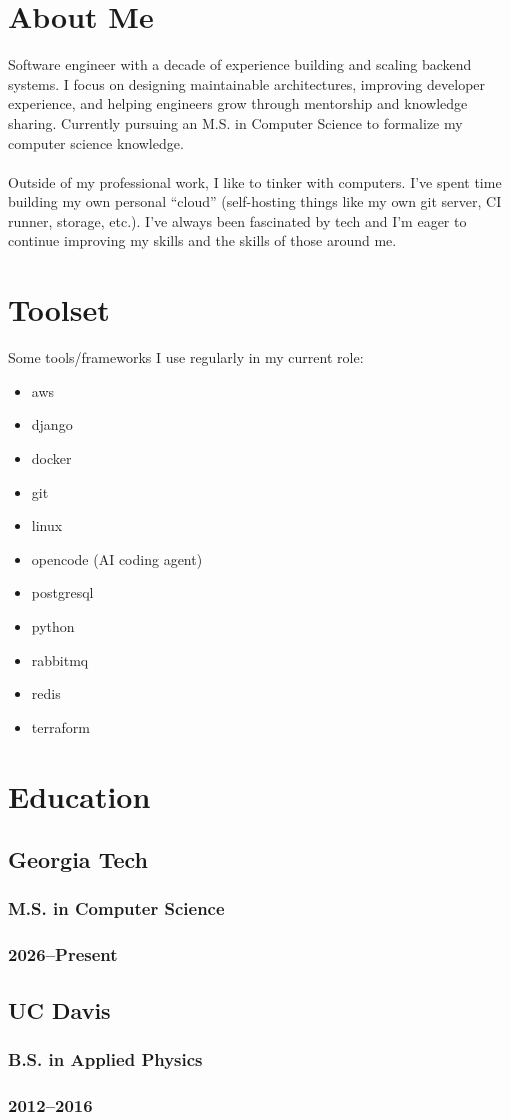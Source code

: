 \documentclass{article}
\begin{document}
\hspace{0.08\textwidth}
\begin{minipage}[t]{.3\textwidth}
	\section*{About Me}
	Software engineer with a decade of experience building and scaling backend
	systems. I focus on designing maintainable architectures, improving developer
	experience, and helping engineers grow through mentorship and knowledge
	sharing. Currently pursuing an M.S. in Computer Science to formalize my
	computer science knowledge.
	\\
	\\
	Outside of my professional work, I like to tinker with computers. I've
	spent time building my own personal ``cloud'' (self-hosting things like my
	own git server, CI runner, storage, etc.). I've always been fascinated by
	tech and I'm eager to continue improving my skills and the skills of those
	around me.
	\vspace{1em}
	\section*{Toolset}
	Some tools/frameworks I use regularly in my current role:
	\begin{itemize}
		\item aws
		\item django
		\item docker
		\item git
		\item linux
		\item opencode (AI coding agent)
		\item postgresql
		\item python
		\item rabbitmq
		\item redis
		\item terraform
	\end{itemize}
	\section*{Education}
	\subsection*{Georgia Tech}
	\subsubsection*{M.S. in Computer Science}
	\subsubsection*{2026--Present}
	\subsection*{UC Davis}
	\subsubsection*{B.S. in Applied Physics}
	\subsubsection*{2012--2016}
\end{minipage}
\end{document}
